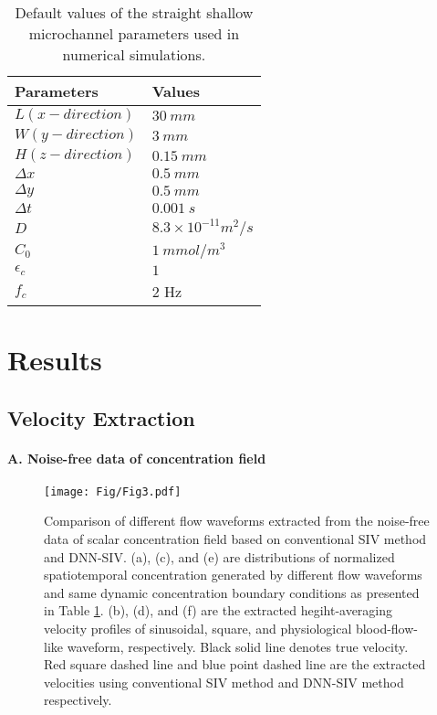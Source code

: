 \documentclass{article}
\begin{document}
\begin{table}
	\caption{Default values of the straight shallow microchannel parameters used in numerical simulations.}
	\centering
	\begin{tabular}{ll}
		\toprule
		Parameters & Values\\
		\midrule
		$L\left(x-direction\right)$ & $30~mm$   \\
		$W\left(y-direction\right)$ & $3~mm$    \\
		$H\left(z-direction\right)$ & $0.15~mm$ \\
		$\Delta x$                  & $0.5~mm$  \\
		$\Delta y$                  & $0.5~mm$  \\
		$\Delta t$                  & $0.001~s$  \\
		$D$                         & $8.3\times10^{-11}m^2/s$  \\
		$C_0$                  		& $1~mmol/m^3$  \\
		$\epsilon_c$                & $1$  \\
		$f_c$		                & $2$ Hz  \\
		\bottomrule
	\end{tabular}
	\label{tab:table1}
\end{table}

\section{Results}
\subsection{Velocity Extraction}
\paragraph{A. Noise-free data of concentration field}
\begin{figure}
	\centering
	\texttt{[image: Fig/Fig3.pdf]}
	\caption{ Comparison of different flow waveforms extracted from the noise-free data of scalar concentration field based on conventional SIV method and DNN-SIV. (a), (c), and (e) are distributions of normalized spatiotemporal concentration generated by different flow waveforms and same dynamic concentration boundary conditions as presented in Table \ref{tab:table1}. (b), (d), and (f) are the extracted hegiht-averaging velocity profiles of sinusoidal, square, and physiological blood-flow-like waveform, respectively. Black solid line denotes true velocity. Red square dashed line and blue point dashed line are the extracted velocities using conventional SIV method and DNN-SIV method respectively.}
	\label{fig:fig3}
\end{figure}
\end{document}
